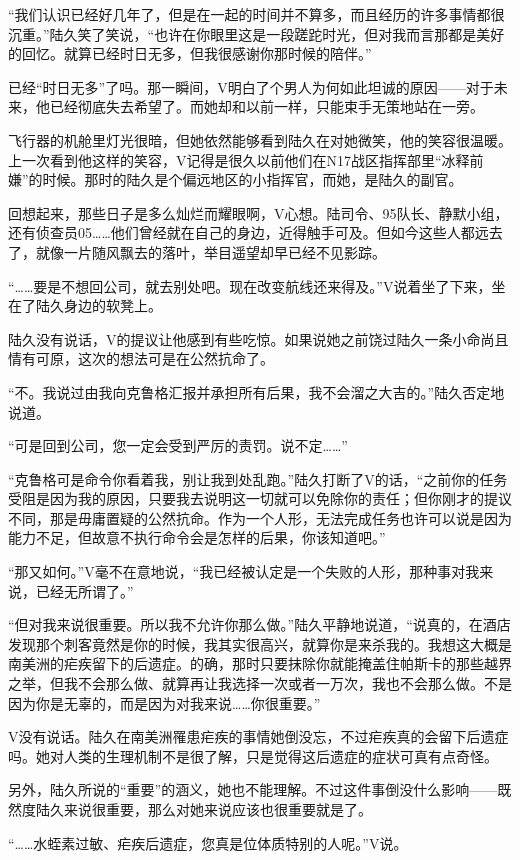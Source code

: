 “我们认识已经好几年了，但是在一起的时间并不算多，而且经历的许多事情都很沉重。”陆久笑了笑说，“也许在你眼里这是一段蹉跎时光，但对我而言那都是美好的回忆。就算已经时日无多，但我很感谢你那时候的陪伴。”

已经“时日无多”了吗。那一瞬间，V明白了个男人为何如此坦诚的原因——对于未来，他已经彻底失去希望了。而她却和以前一样，只能束手无策地站在一旁。

飞行器的机舱里灯光很暗，但她依然能够看到陆久在对她微笑，他的笑容很温暖。上一次看到他这样的笑容，V记得是很久以前他们在N17战区指挥部里“冰释前嫌”的时候。那时的陆久是个偏远地区的小指挥官，而她，是陆久的副官。

回想起来，那些日子是多么灿烂而耀眼啊，V心想。陆司令、95队长、静默小组，还有侦查员05……他们曾经就在自己的身边，近得触手可及。但如今这些人都远去了，就像一片随风飘去的落叶，举目遥望却早已经不见影踪。

“……要是不想回公司，就去别处吧。现在改变航线还来得及。”V说着坐了下来，坐在了陆久身边的软凳上。

陆久没有说话，V的提议让他感到有些吃惊。如果说她之前饶过陆久一条小命尚且情有可原，这次的想法可是在公然抗命了。

“不。我说过由我向克鲁格汇报并承担所有后果，我不会溜之大吉的。”陆久否定地说道。

“可是回到公司，您一定会受到严厉的责罚。说不定……”

“克鲁格可是命令你看着我，别让我到处乱跑。”陆久打断了V的话，“之前你的任务受阻是因为我的原因，只要我去说明这一切就可以免除你的责任；但你刚才的提议不同，那是毋庸置疑的公然抗命。作为一个人形，无法完成任务也许可以说是因为能力不足，但故意不执行命令会是怎样的后果，你该知道吧。”

“那又如何。”V毫不在意地说，“我已经被认定是一个失败的人形，那种事对我来说，已经无所谓了。”

“但对我来说很重要。所以我不允许你那么做。”陆久平静地说道，“说真的，在酒店发现那个刺客竟然是你的时候，我其实很高兴，就算你是来杀我的。我想这大概是南美洲的疟疾留下的后遗症。的确，那时只要抹除你就能掩盖住帕斯卡的那些越界之举，但我不会那么做、就算再让我选择一次或者一万次，我也不会那么做。不是因为你是无辜的，而是因为对我来说……你很重要。”

V没有说话。陆久在南美洲罹患疟疾的事情她倒没忘，不过疟疾真的会留下后遗症吗。她对人类的生理机制不是很了解，只是觉得这后遗症的症状可真有点奇怪。

另外，陆久所说的“重要”的涵义，她也不能理解。不过这件事倒没什么影响——既然度陆久来说很重要，那么对她来说应该也很重要就是了。

“……水蛭素过敏、疟疾后遗症，您真是位体质特别的人呢。”V说。

